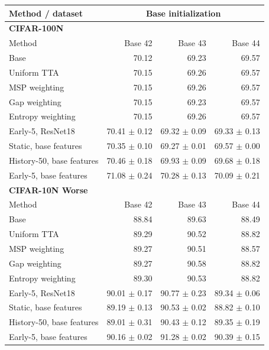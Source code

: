 \begin{tabular}{lrrr}
\toprule
Method / dataset & \multicolumn{3}{c}{Base initialization} \\
\midrule
\multicolumn{4}{l}{\textbf{CIFAR-100N}} \\
Method & Base 42 & Base 43 & Base 44 \\
Base & 70.12 & 69.23 & 69.57 \\
Uniform TTA & 70.15 & 69.26 & 69.57 \\
MSP weighting & 70.15 & 69.26 & 69.57 \\
Gap weighting & 70.15 & 69.23 & 69.57 \\
Entropy weighting & 70.15 & 69.26 & 69.57 \\
Early-5, ResNet18 & 70.41 $\pm$ 0.12 & 69.32 $\pm$ 0.09 & 69.33 $\pm$ 0.13 \\
Static, base features & 70.35 $\pm$ 0.10 & 69.27 $\pm$ 0.01 & 69.57 $\pm$ 0.00 \\
History-50, base features & 70.46 $\pm$ 0.18 & 69.93 $\pm$ 0.09 & 69.68 $\pm$ 0.18 \\
Early-5, base features & 71.08 $\pm$ 0.24 & 70.28 $\pm$ 0.13 & 70.09 $\pm$ 0.21 \\
\multicolumn{4}{l}{\textbf{CIFAR-10N Worse}} \\
Method & Base 42 & Base 43 & Base 44 \\
Base & 88.84 & 89.63 & 88.49 \\
Uniform TTA & 89.29 & 90.52 & 88.82 \\
MSP weighting & 89.27 & 90.51 & 88.57 \\
Gap weighting & 89.27 & 90.58 & 88.82 \\
Entropy weighting & 89.30 & 90.53 & 88.82 \\
Early-5, ResNet18 & 90.01 $\pm$ 0.17 & 90.77 $\pm$ 0.23 & 89.34 $\pm$ 0.06 \\
Static, base features & 89.19 $\pm$ 0.13 & 90.53 $\pm$ 0.02 & 88.82 $\pm$ 0.10 \\
History-50, base features & 89.01 $\pm$ 0.31 & 90.43 $\pm$ 0.12 & 89.35 $\pm$ 0.19 \\
Early-5, base features & 90.16 $\pm$ 0.02 & 91.28 $\pm$ 0.02 & 90.39 $\pm$ 0.15 \\
\bottomrule
\end{tabular}
